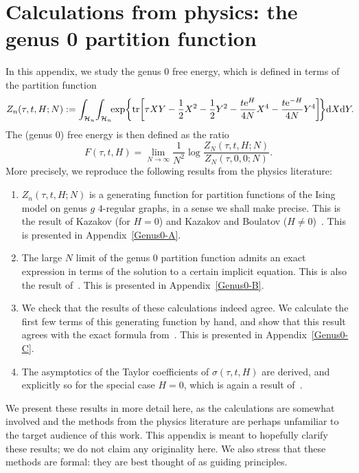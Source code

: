 \documentclass[pdftex]{sigma}
\DeclareMathOperator{\tr}{tr}
\numberwithin{equation}{section}
\begin{document}
\section[Calculations from physics: the genus $0$ partition function]{Calculations from physics: the genus $\boldsymbol{0}$ partition function}
In this appendix, we study the genus $0$ free energy, which is defined in terms of the partition function
\begin{align} \label{C2:2-matrix-partition function}
 Z_n(\tau,t,H;N) := \int_{\mathcal{H}_n}\!\int_{\mathcal{H}_n}\!\! \exp \biggl\{\tr \biggl[\tau XY - \frac{1}{2}X^2 -\frac{1}{2}Y^2 - \frac{t{\rm e}^H}{4N} X^4 - \frac{t{\rm e}^{-H}}{4N}Y^4\biggr]\!\biggr\} {\rm d}X{\rm d}Y.\!\!
 \end{align}
The (genus $0$) free energy is then defined as the ratio
 \begin{equation*}
 F(\tau,t,H) = \lim_{N\to \infty}\frac{1}{N^2}\log \frac{Z_N(\tau,t,H;N)}{Z_N(\tau,0,0;N)}.
 \end{equation*}
More precisely, we reproduce the following results from the physics literature:
 \begin{enumerate}\itemsep=0pt
 \item[$(1)$] $Z_n(\tau,t,H;N)$ is a generating function for partition functions of the Ising model on genus $g$ $4$-regular graphs, in a sense we shall make precise. This is the result of Kazakov (for $H=0$) and Kazakov and Boulatov ($H\neq 0$)~\cite{Kazakov2,Kazakov1}. This is presented in Appendix~\ref{Genus0-A}.
 \item[$(2)$] The large $N$ limit of the genus $0$ partition function admits an exact expression in terms of the solution to a certain implicit equation. This
 is also the result of~\cite{Kazakov2,Kazakov1}. This is presented in Appendix~\ref{Genus0-B}.
 \item[$(3)$] We check that the results of these calculations indeed agree. We calculate the first few terms of this generating function by hand, and show that this result agrees with the exact formula from~\cite{Kazakov2,Kazakov1}. This is presented in Appendix~\ref{Genus0-C}.
 \item[$(4)$] The asymptotics of the Taylor coefficients of $\sigma(\tau,t,H)$ are derived, and explicitly so for the special case $H=0$, which is again a result of~\cite{Kazakov1}.
 \end{enumerate}
We present these results in more detail here, as the calculations are somewhat involved and the methods from the physics literature are perhaps unfamiliar to the target audience of this work. This appendix is meant to hopefully clarify these results; we do not claim any originality here. We also stress that these methods are formal: they are best thought of as guiding principles.
\end{document}
